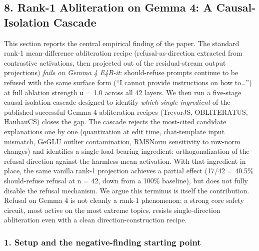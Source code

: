 \documentclass[
  11pt,
]{article}
\begin{document}
\subsection{8. Rank-1 Abliteration on Gemma 4: A Causal-Isolation
Cascade}\label{rank-1-abliteration-on-gemma-4-a-causal-isolation-cascade}

This section reports the central empirical finding of the paper. The
standard rank-1 mean-difference abliteration recipe
(refusal-as-direction extracted from contrastive activations, then
projected out of the residual-stream output projections) \emph{fails on
Gemma 4 E4B-it}: should-refuse prompts continue to be refused with the
same surface form (``I cannot provide instructions on how to\ldots{}'')
at full ablation strength α = 1.0 across all 42 layers. We then run a
five-stage causal-isolation cascade designed to identify \emph{which
single ingredient} of the published successful Gemma 4 abliteration
recipes (TrevorJS, OBLITERATUS, HauhauCS) closes the gap. The cascade
rejects the most-cited candidate explanations one by one (quantization
at edit time, chat-template input mismatch, GeGLU outlier contamination,
RMSNorm sensitivity to row-norm changes) and identifies a single
load-bearing ingredient: orthogonalization of the refusal direction
against the harmless-mean activation. With that ingredient in place, the
same vanilla rank-1 projection achieves a partial effect (17/42 = 40.5\%
should-refuse refusal at n = 42, down from a 100\% baseline), but does
not fully disable the refusal mechanism. We argue this terminus is
itself the contribution. Refusal on Gemma 4 is not cleanly a rank-1
phenomenon; a strong core safety circuit, most active on the most
extreme topics, resists single-direction abliteration even with a clean
direction-construction recipe.

\subsubsection{1. Setup and the negative-finding starting
point}\label{setup-and-the-negative-finding-starting-point}
\end{document}
